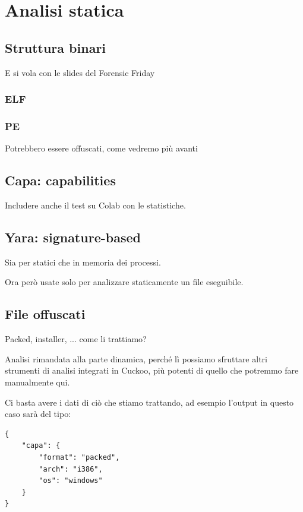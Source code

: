 \chapter{Analisi statica}

\section{Struttura binari}

E si vola con le slides del Forensic Friday

\subsection{ELF}

\subsection{PE}
Potrebbero essere offuscati, come vedremo più avanti

\section{Capa: capabilities}
Includere anche il test su Colab con le statistiche.

\section{Yara: signature-based}
Sia per statici che in memoria dei processi.

Ora però usate solo per analizzare staticamente un file eseguibile.

\section{File offuscati}
Packed, installer, ... come li trattiamo?

Analisi rimandata alla parte dinamica, perché lì possiamo sfruttare altri strumenti di analisi integrati in Cuckoo, più potenti di quello che potremmo fare manualmente qui.

Ci basta avere i dati di ciò che stiamo trattando, ad esempio l'output in questo caso sarà del tipo:
\begin{code}
\label{code:json_capa_packed}
\begin{verbatim}
{
    "capa": {
        "format": "packed",
        "arch": "i386",
        "os": "windows"
    }
}
\end{verbatim}
\end{code}

